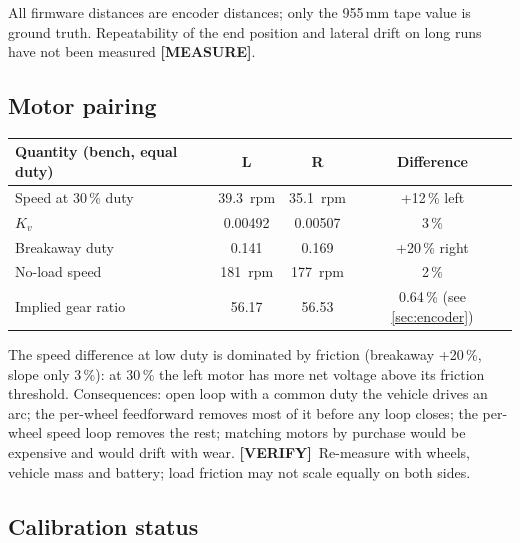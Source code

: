 \documentclass[11pt,a4paper]{article}
\newcommand{\mk}[2]{\textsf{\scriptsize\bfseries\colorbox{#1bg}{\color{#1}[#2]}}}
\newcommand{\MEASURE}{\mk{warn}{MEASURE}}
\newcommand{\VERIFY}{\mk{cold}{VERIFY}}
\begin{document}
All firmware distances are encoder distances; only the 955\,mm tape value is
ground truth. Repeatability of the end position and lateral drift on long runs
have not been measured \MEASURE.

\subsection{Motor pairing}\label{sec:pairing}

\begin{center}
\small
\begin{tabular}{@{}lccc@{}}
\toprule
\textbf{Quantity (bench, equal duty)} & \textbf{L} & \textbf{R} & \textbf{Difference}\\
\midrule
Speed at 30\,\% duty & \qty{39.3}{rpm} & \qty{35.1}{rpm} & +12\,\% left\\
$K_v$ & 0.00492 & 0.00507 & 3\,\%\\
Breakaway duty & 0.141 & 0.169 & +20\,\% right\\
No-load speed & \qty{181}{rpm} & \qty{177}{rpm} & 2\,\%\\
Implied gear ratio & 56.17 & 56.53 & 0.64\,\% (see \cref{sec:encoder})\\
\bottomrule
\end{tabular}
\end{center}

The speed difference at low duty is dominated by friction (breakaway +20\,\%,
slope only 3\,\%): at 30\,\% the left motor has more net voltage above its
friction threshold. Consequences: open loop with a common duty the vehicle
drives an arc; the per-wheel feedforward removes most of it before any loop
closes; the per-wheel speed loop removes the rest; matching motors by purchase
would be expensive and would drift with wear. \VERIFY\ Re-measure with wheels,
vehicle mass and battery; load friction may not scale equally on both sides.

\subsection{Calibration status}\label{sec:calibstatus}
\end{document}
